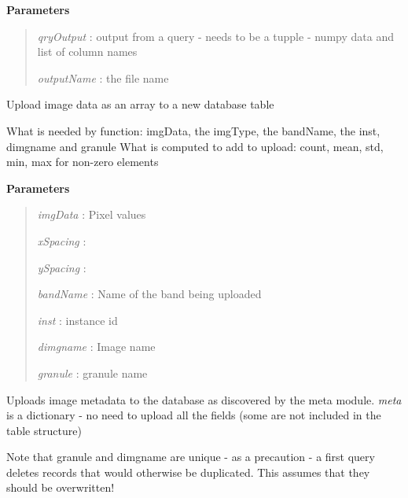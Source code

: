 \documentclass[letterpaper,10pt,openany,oneside]{sphinxmanual}
\begin{document}
\begin{fulllineitems}
\begin{fulllineitems}
\textbf{Parameters}
\begin{quote}

\emph{qryOutput}  : output from a query - needs to be a tupple - numpy data and list of column names

\emph{outputName} : the file name
\end{quote}

\end{fulllineitems}


\begin{fulllineitems}
\label{code:Database.Database.imgData2db}
Upload image data as an array to a new database table

What is needed by function: imgData, the imgType, the bandName, the inst, dimgname and granule        
What is computed to add to upload: count, mean, std, min, max for non-zero elements

\textbf{Parameters}
\begin{quote}

\emph{imgData}   : Pixel values

\emph{xSpacing}  :

\emph{ySpacing}  :

\emph{bandName}  : Name of the band being uploaded

\emph{inst}      : instance id

\emph{dimgname}  : Image name

\emph{granule}   : granule name
\end{quote}

\end{fulllineitems}


\begin{fulllineitems}
\label{code:Database.Database.meta2db}
Uploads image metadata to the database as discovered by the meta module.
\emph{meta} is a dictionary - no need to upload all the fields (some are not
included in the table structure)

Note that granule and dimgname are unique - as a precaution - a first query
deletes records that would otherwise be duplicated. 
This assumes that they should be overwritten!


\end{fulllineitems}
\end{fulllineitems}
\end{document}
